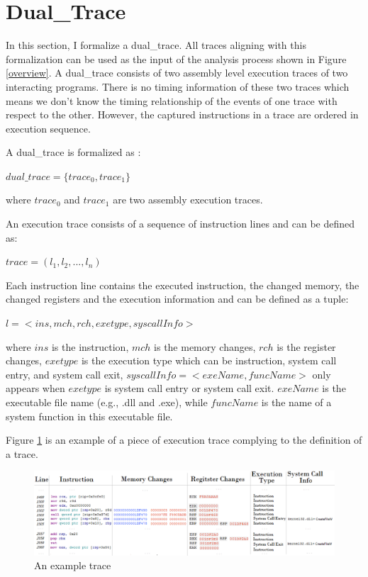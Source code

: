 \section{Dual\_Trace}\label{dualtrace}
In this section, I formalize a dual\_trace. All traces aligning with this formalization can be used as the input of the analysis process shown in Figure \ref{overview}. A dual\_trace consists of two assembly level execution traces of two interacting programs. There is no timing information of these two traces which means we don't know the timing relationship of the events of one trace with respect to the other. However, the captured instructions in a trace are ordered in execution sequence. 

A dual\_trace is formalized as :

$dual\_trace = \lbrace trace_0, trace_1\rbrace$

where $trace_0$ and $trace_1$ are two assembly execution traces.

An execution trace consists of a sequence of instruction lines and can be defined as: 

$ trace = (l_1, l_2, ..., l_n)$ 

Each instruction line contains the executed instruction, the changed memory, the changed registers and the execution information and can be defined as a tuple:

$l = <ins, mch, rch, exetype, syscallInfo>$

where $ins$ is the instruction, $mch$ is the memory changes, $rch$ is the register changes, $exetype$ is the execution type which can be instruction, system call entry, and system call exit, $syscallInfo = <exeName, funcName>$ only appears when $exetype$ is system call entry or system call exit. $exeName$ is the executable file name (e.g., .dll and .exe), while $funcName$ is the name of a system function in this executable file.

Figure \ref{tracedefined} is an example of a piece of execution trace complying to the definition of a trace. 

\begin{figure}[H]
\centerline{\includegraphics[scale=0.5]{Figures/tracedefined}}
\caption{An example trace }
\label{tracedefined}
\end{figure}



